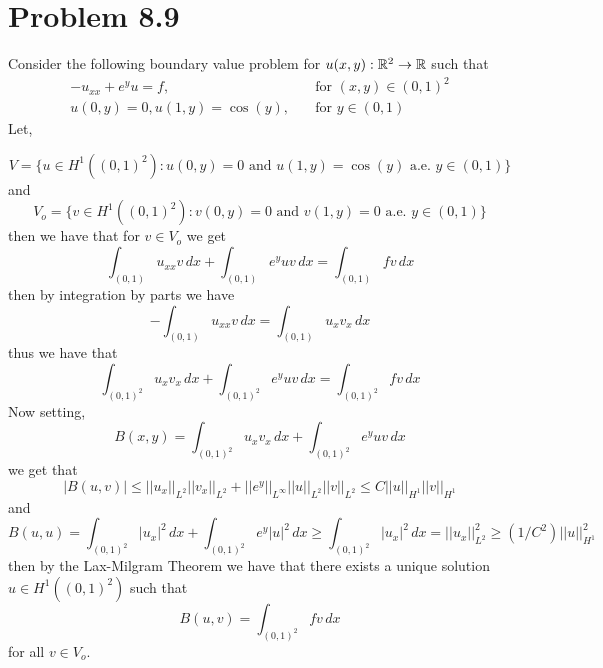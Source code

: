 \documentclass[12pt]{report}
\newcommand{\norm}[1]{\left|\left|#1\right|\right|}
\begin{document}
\section*{Problem 8.9}
Consider the following boundary value problem for $u(x,y): \mathbb{R}^2 \to \mathbb{R}$ such that
\begin{align*}
  -u_{xx} + e^yu = f, \quad &\text{for } (x,y) \in (0,1)^2 \\
  u(0,y) = 0, u(1,y) = \cos(y), \quad &\text{for } y\in(0,1)
\end{align*}
Let,

\begin{equation*}
V = \{u \in H^1((0,1)^2): u(0,y) = 0 \text{ and } u(1,y) = \cos(y) \text{ a.e. } y \in (0,1)\}
\end{equation*}
and
\begin{equation*}
  V_o = \{v \in H^1((0,1)^2): v(0,y) = 0 \text{ and } v(1,y) = 0 \text{ a.e. } y \in (0,1)\}
\end{equation*}
then we have that for $v \in V_o$ we get
\begin{equation*}
  \int_{(0,1)} u_{xx}v \, dx + \int_{(0,1)}e^y uv \, dx = \int_{(0,1)} f v \, dx
\end{equation*}
then by integration by parts we have
\begin{equation*}
-\int_{(0,1)} u_{xx} v \, dx = \int_{(0,1)} u_x v_x \, dx
\end{equation*}
thus we have that
\begin{equation*}
  \int_{(0,1)^2} u_x v_x \, dx + \int_{(0,1)^2} e^y uv \, dx = \int_{(0,1)^2} f v \, dx
\end{equation*}
Now setting,
\begin{equation*}
  B(x,y) = \int_{(0,1)^2} u_x v_x \, dx + \int_{(0,1)^2} e^y uv \, dx
\end{equation*}
we get that
\begin{equation*}
  |B(u,v)| \leq \norm{u_x}_{L^2} \norm{v_x}_{L^2} + \norm{e^y}_{L^\infty} \norm{u}_{L^2} \norm{v}_{L^2} \leq C \norm{u}_{H^1} \norm{v}_{H^1}
\end{equation*}
and
\begin{equation*}
  B(u,u) = \int_{(0,1)^2} |u_x|^2 \, dx + \int_{(0,1)^2} e^y |u|^2 \, dx \geq \int_{(0,1)^2} |u_x|^2 \, dx = \norm{u_x}_{L^2}^2 \geq (1/C^2) \norm{u}_{H^1}^2
\end{equation*}
then by the Lax-Milgram Theorem we have that there exists a unique solution $u \in H^1((0,1)^2)$ such that
\begin{equation*}
  B(u,v) = \int_{(0,1)^2} f v \, dx
\end{equation*}
for all $v \in V_o$.
\end{document}
